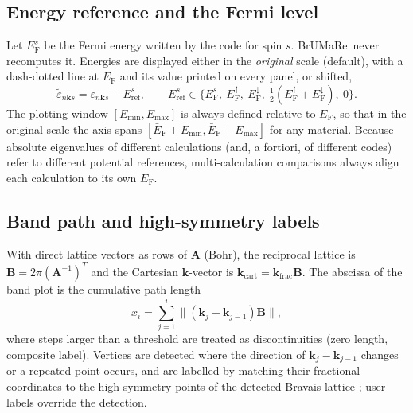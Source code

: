 \documentclass[11pt,a4paper]{article}
\newcommand{\eF}{E_\mathrm{F}}
\newcommand{\BMR}{\textsf{BrUMa\textcolor[HTML]{B26B00}{Re}}}
\begin{document}
\subsection{Energy reference and the Fermi level}
Let $\eF^{s}$ be the Fermi energy written by the code for spin $s$. \BMR\ never recomputes it. Energies are displayed either in the \emph{original} scale (default), with a dash-dotted line at $\eF$ and its value printed on every panel, or shifted,
\begin{equation}
\tilde\varepsilon_{n\bm{k} s}=\varepsilon_{n\bm{k} s}-E_\mathrm{ref}^{s},\qquad E_\mathrm{ref}^{s}\in\Big\{\eF^{s},\ \eF^{\uparrow},\ \eF^{\downarrow},\ \tfrac12(\eF^{\uparrow}+\eF^{\downarrow}),\ 0\Big\}.
\end{equation}
The plotting window $[E_\mathrm{min},E_\mathrm{max}]$ is always defined relative to $\eF$, so that in the original scale the axis spans $[\bar E_\mathrm{F}+E_\mathrm{min},\bar E_\mathrm{F}+E_\mathrm{max}]$ for any material. Because absolute eigenvalues of different calculations (and, a fortiori, of different codes) refer to different potential references, multi-calculation comparisons always align each calculation to its own $\eF$.

\subsection{Band path and high-symmetry labels}
With direct lattice vectors as rows of $\mathbf A$ (Bohr), the reciprocal lattice is $\mathbf B=2\pi(\mathbf A^{-1})^{T}$ and the Cartesian $\bm{k}$-vector is $\bm{k}_\mathrm{cart}=\bm{k}_\mathrm{frac}\mathbf B$. The abscissa of the band plot is the cumulative path length
\begin{equation}
x_i=\sum_{j=1}^{i}\lVert(\bm{k}_j-\bm{k}_{j-1})\mathbf B\rVert ,
\end{equation}
where steps larger than a threshold are treated as discontinuities (zero length, composite label). Vertices are detected where the direction of $\bm{k}_j-\bm{k}_{j-1}$ changes or a repeated point occurs, and are labelled by matching their fractional coordinates to the high-symmetry points of the detected Bravais lattice \cite{setyawan2010}; user labels override the detection.
\end{document}
